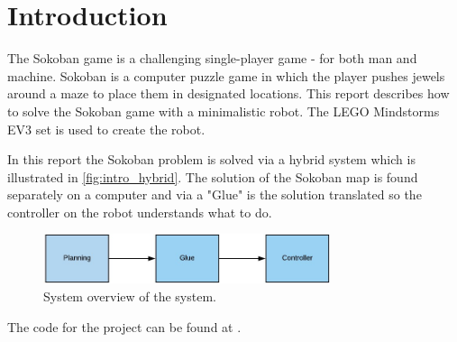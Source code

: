 \documentclass[../report.tex]{subfiles}
\begin{document}
\section{Introduction} \label{sec:intro}

The Sokoban game is a challenging single-player game - for both man and machine. Sokoban is a computer puzzle game in which the player pushes jewels around a maze to place them in designated locations. This report describes how to solve the Sokoban game with a minimalistic robot. The LEGO Mindstorms EV3 set \cite{ev3} is used to create the robot.

In this report the Sokoban problem is solved via a hybrid system which is illustrated in \autoref{fig:intro_hybrid}. The solution of the Sokoban map is found separately on a computer and via a "Glue" is the solution translated so the controller on the robot understands what to do. 

\begin{figure}[H]
    \centering
    \includegraphics[width=0.75\textwidth]{figures/System_overview.jpg}
    \caption{System overview of the system.}
    \label{fig:intro_hybrid}
\end{figure}

The code for the project can be found at \cite{code}.
\end{document}
